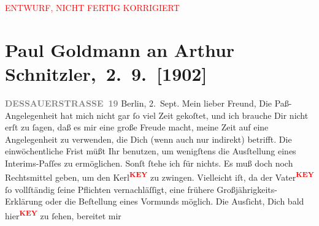 
\begin{center}
            \textcolor{red}{ENTWURF, NICHT FERTIG KORRIGIERT}
                      \end{center}
            
         
         \renewcommand{\erwaehntePersonen}{Personen: Olga Schnitzler}
         \renewcommand{\erwaehnteOrte}{Orte: Berlin, Dessauer Straße, Wien}
         \renewcommand{\erwaehnteWerke}{Werke: Der Schleier der Beatrice. Schauspiel in fünf Akten}
               \section[ Paul Goldmann an Arthur Schnitzler, 2. 9. {[}1902{]}]{ Paul Goldmann an Arthur Schnitzler, 2. 9. {[}1902{]}}\nopagebreak{}\rehead{ }\begin{ledgroupsized}[t]{13cm}\normalsize\beginnumbering \toendnotes[C]{\smallbreak\pagebreak[2]} 
\pstart
           \noindent{}\raggedleft{}{\pb}\textcolor{gray}{\textbf{DESSAUERSTRASSE 19}}\pend
           \pstart
           Berlin, 2. Sept.\pend
           \pstart\center{}Mein lieber Freund,\pend\pstart
           Die Paß-Angelegenheit hat mich nicht gar ſo viel Zeit gekoſtet, und ich brauche
                    Dir nicht erſt zu ſagen, daß es mir eine große Freude macht, meine Zeit auf eine
                    Angelegenheit zu verwenden, die Dich (wenn auch nur indirekt) betrifft. Die
                    einwöchentliche Frist müßt Ihr benutzen, um wenigſtens die Ausſtellung eines
                    Interims-Paſſes zu ermöglichen. Sonſt ſtehe ich {\pb} für nichts. Es muß doch noch Rechtsmittel geben, um den Kerl\textcolor{red}{\textsuperscript{\textbf{KEY}}} zu zwingen. Vielleicht iſt, da der Vater\textcolor{red}{\textsuperscript{\textbf{KEY}}} ſo vollſtändig ſeine Pflichten vernachläſſigt, eine frühere
                    Großjährigkeits-Erklärung oder die Beſtellung eines Vormunds möglich. \pend
           \pstart
           Die Ausſicht, Dich bald hier\textcolor{red}{\textsuperscript{\textbf{KEY}}} zu ſehen, bereitet mir

\end{ledgroupsized}
